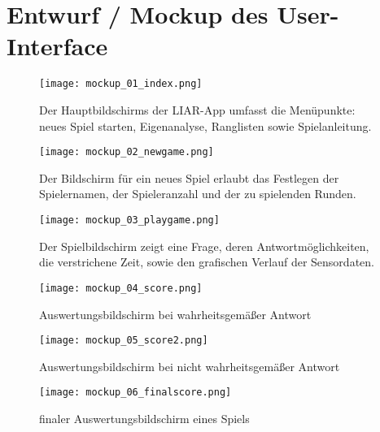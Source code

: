 	\newpage
   	\section{Entwurf / Mockup des User-Interface}

	\begin{figure}[ht!]
		\begin{center}
			\texttt{[image: mockup\_01\_index.png]}
		\end{center}
		\caption[Mockup Hauptbildschirm]{Der Hauptbildschirms der LIAR-App umfasst die Menüpunkte: neues Spiel starten, Eigenanalyse, Ranglisten sowie Spielanleitung. }
		\label{fig:mockup_01}
	\end{figure}	
	\begin{figure}[h!]
		\begin{center}
			\texttt{[image: mockup\_02\_newgame.png]}
		\end{center}
		\caption[Mockup Bildschirm für neues Spiel]{Der Bildschirm für ein neues Spiel erlaubt das Festlegen der Spielernamen, der Spieleranzahl und der zu spielenden Runden.}
		\label{fig:mockup_02}
	\end{figure}	

	\newpage
	\begin{figure}[ht!]
		\begin{center}
			\texttt{[image: mockup\_03\_playgame.png]}
		\end{center}
		\caption[Mockup Spielbildschirm]{Der Spielbildschirm zeigt eine Frage, deren Antwortmöglichkeiten, die verstrichene Zeit, sowie den grafischen Verlauf der Sensordaten.}
		\label{fig:mockup_03}
	\end{figure}	
	\begin{figure}[h!]
		\begin{center}
			\texttt{[image: mockup\_04\_score.png]}
		\end{center}
		\caption[Mockup Bildschirm Fragenauswertung Wahrheit]{Auswertungsbildschirm bei wahrheitsgemäßer Antwort}
		\label{fig:mockup_04}
	\end{figure}	

	\newpage
	\begin{figure}[ht!]
		\begin{center}
			\texttt{[image: mockup\_05\_score2.png]}
		\end{center}
		\caption[Mockup Bildschirm Fragenauswertung Lüge]{Auswertungsbildschirm bei nicht wahrheitsgemäßer Antwort}
		\label{fig:mockup_05}
	\end{figure}	
	\begin{figure}[h!]
		\begin{center}
			\texttt{[image: mockup\_06\_finalscore.png]}
		\end{center}
		\caption[Mockup finaler Bildschirm zur Fragenauswertung]{finaler Auswertungsbildschirm eines Spiels}
		\label{fig:mockup_06}
	\end{figure}	

